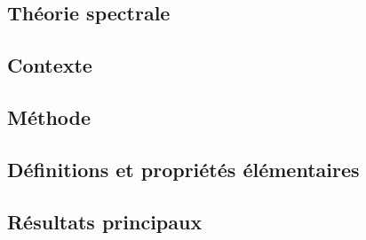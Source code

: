 \documentclass[11pt,a4paper]{article}
\begin{document}
\newpage
\begin{center}  
\section*{Théorie spectrale} 
\end{center}


\subsection*{Contexte}

\subsection*{Méthode}

\subsection*{Définitions et propriétés élémentaires}



\subsection*{Résultats principaux}

\end{document}

